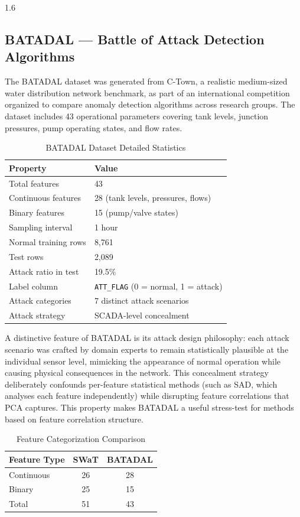 \begin{spacing}{1.6}
\subsection{BATADAL --- Battle of Attack Detection Algorithms}

The BATADAL dataset \cite{batadal} was generated from C-Town, a realistic
medium-sized water distribution network benchmark, as part of an international
competition organized to compare anomaly detection algorithms across research
groups. The dataset includes 43 operational parameters covering tank levels,
junction pressures, pump operating states, and flow rates.

\begin{table}[H]
\centering
\caption{BATADAL Dataset Detailed Statistics}
\label{tab:batadal_detail}
\begin{tabular}{ll}
\toprule
\textbf{Property} & \textbf{Value} \\
\midrule
Total features & 43 \\
Continuous features & 28 (tank levels, pressures, flows) \\
Binary features & 15 (pump/valve states) \\
Sampling interval & 1 hour \\
Normal training rows & 8,761 \\
Test rows & 2,089 \\
Attack ratio in test & 19.5\% \\
Label column & \texttt{ATT\_FLAG} (0 = normal, 1 = attack) \\
Attack categories & 7 distinct attack scenarios \\
Attack strategy & SCADA-level concealment \\
\bottomrule
\end{tabular}
\end{table}

A distinctive feature of BATADAL is its attack design philosophy: each attack
scenario was crafted by domain experts to remain statistically plausible at the
individual sensor level, mimicking the appearance of normal operation while
causing physical consequences in the network. This concealment strategy
deliberately confounds per-feature statistical methods (such as SAD, which
analyses each feature independently) while disrupting feature correlations
that PCA captures. This property makes BATADAL a useful stress-test for methods
based on feature correlation structure.

\begin{table}[H]
\centering
\caption{Feature Categorization Comparison}
\label{tab:featcat}
\begin{tabular}{lcc}
\toprule
\textbf{Feature Type} & \textbf{SWaT} & \textbf{BATADAL} \\
\midrule
Continuous & 26 & 28 \\
Binary & 25 & 15 \\
Total & 51 & 43 \\
\bottomrule
\end{tabular}
\end{table}

\end{spacing}
